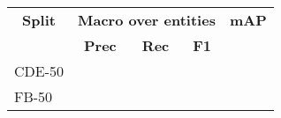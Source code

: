 \begin{tabular}{| l | r | r | r | r |}
    \hline

    \multicolumn{1}{|c|}{\textbf{Split}} &
    \multicolumn{3}{|c|}{\textbf{Macro over entities}} &
    \multicolumn{1}{|c|}{\textbf{mAP}} \\

    \multicolumn{1}{|c|}{} &
    \multicolumn{1}{|c|}{\textbf{Prec}} &
    \multicolumn{1}{|c|}{\textbf{Rec}} &
    \multicolumn{1}{|c|}{\textbf{F1}} &
    \multicolumn{1}{|c|}{} \\

    \hline \hline

    CDE-50 &  &  &  &  \\
    FB-50  &  &  &  &  \\

    \hline
\end{tabular}
